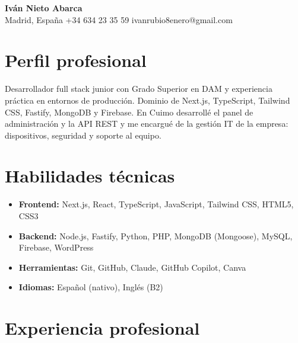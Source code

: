 \documentclass[10pt,a4paper]{article}
\begin{document}
\begin{center}
    {\LARGE \textbf{Iván Nieto Abarca}} \\
    \vspace{2pt}
    Madrid, España \textbullet{} +34 634 23 35 59 \textbullet{} ivanrubio8enero@gmail.com
\end{center}

\section{Perfil profesional}
Desarrollador full stack junior con Grado Superior en DAM y experiencia práctica en entornos de producción. Dominio de Next.js, TypeScript, Tailwind CSS, Fastify, MongoDB y Firebase. En Cuimo desarrollé el panel de administración y la API REST y me encargué de la gestión IT de la empresa: dispositivos, seguridad y soporte al equipo.

\section{Habilidades técnicas}
\begin{itemize}
    \item \textbf{Frontend:} Next.js, React, TypeScript, JavaScript, Tailwind CSS, HTML5, CSS3
    \item \textbf{Backend:} Node.js, Fastify, Python, PHP, MongoDB (Mongoose), MySQL, Firebase, WordPress
    \item \textbf{Herramientas:} Git, GitHub, Claude, GitHub Copilot, Canva
    \item \textbf{Idiomas:} Español (nativo), Inglés (B2)
\end{itemize}

\section{Experiencia profesional}
\end{document}
